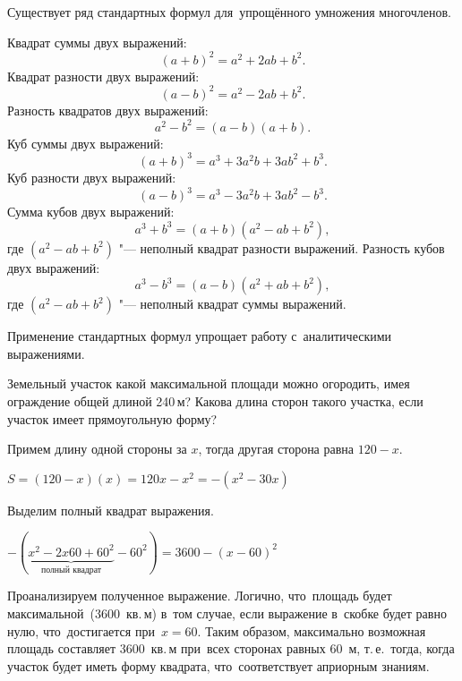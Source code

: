 \documentclass[]{scrartcl}
\begin{document}
Существует ряд стандартных формул для~упрощённого умножения многочленов.

Квадрат суммы двух выражений:
\begin{equation}\label{eq:simple-multipl-of-polynomials-1}
(a+b)^2=a^2+2ab+b^2.
\end{equation}
Квадрат разности двух выражений:
\begin{equation}\label{eq:simple-multipl-of-polynomials-2}
(a-b)^2=a^2-2ab+b^2.
\end{equation}
Разность квадратов двух выражений:
\begin{equation}\label{eq:simple-multipl-of-polynomials-3}
a^2-b^2 = (a-b)(a+b).
\end{equation}
Куб суммы двух выражений:
\begin{equation}\label{eq:simple-multipl-of-polynomials-4}
(a+b)^3 = a^3 + 3a^{2}b+3ab^{2}+b^3.
\end{equation}
Куб разности двух выражений:
\begin{equation}\label{eq:simple-multipl-of-polynomials-5}
(a-b)^3 = a^3 - 3a^{2}b+3ab^{2}-b^3.
\end{equation}
Сумма кубов двух выражений:
\begin{equation}\label{eq:simple-multipl-of-polynomials-6}
a^3+b^3=(a+b)(a^2-ab+b^2),
\end{equation}
где $(a^2-ab+b^2)$ "--- неполный квадрат разности выражений.
Разность кубов двух выражений:
\begin{equation}\label{eq:simple-multipl-of-polynomials-7}
a^3-b^3=(a-b)(a^2+ab+b^2),
\end{equation}
где $(a^2-ab+b^2)$ "--- неполный квадрат суммы выражений.

Применение стандартных формул упрощает работу с~аналитическими выражениями.

\begin{Thexmpl}\label{ex:full-square}
	Земельный участок какой максимальной площади можно огородить, имея ограждение общей длиной 240\,м? Какова длина сторон такого участка, если участок имеет прямоугольную форму? 
	
	Примем длину одной стороны за $x$, тогда другая сторона равна $120-x$.
	
	$S=(120-x)(x)=120x-x^2=-(x^2-30x)$
	
	Выделим полный квадрат выражения.
	
	$-(\underbrace{x^2-2x60+60^2}_{\text{полный квадрат}}-60^2)=3600-(x-60)^2$
	
	Проанализируем полученное выражение. Логично, что~площадь будет максимальной~(3600~кв.\,м) в~том случае, если выражение в~скобке будет равно нулю, что~достигается при~$x=60$. Таким образом, максимально возможная площадь составляет 3600~кв.\,м при~всех сторонах равных 60~м, т.\,е.~тогда, когда участок будет иметь форму квадрата, что~соответствует априорным знаниям.
\end{Thexmpl}
\end{document}
